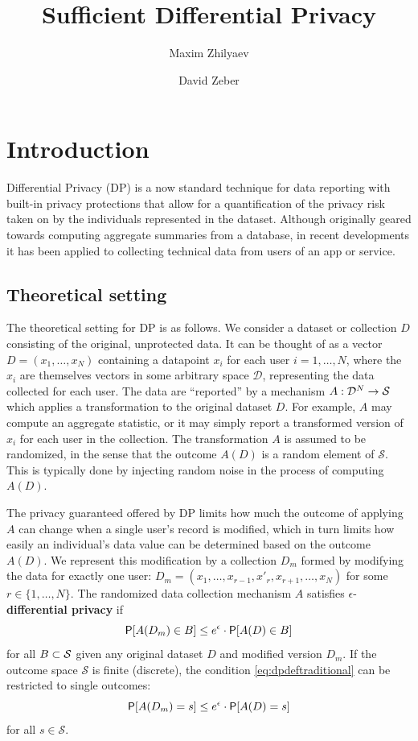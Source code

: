 \documentclass[11pt]{article}
\title{Sufficient Differential Privacy}
\author{Maxim Zhilyaev \and David Zeber}
\newcommand{\Dsp}{\mathcal{D}}
\newcommand{\Ssp}{\mathcal{S}}
\begin{document}
\maketitle


\section{Introduction}

Differential Privacy (DP) is a now standard technique for data reporting with built-in privacy protections that allow for a quantification of the privacy risk taken on by the individuals represented in the dataset.
Although originally geared towards computing aggregate summaries from a database, in recent developments it has been applied to collecting technical data from users of an app or service.

\subsection{Theoretical setting}

The theoretical setting for DP is as follows.
We consider a dataset or collection $D$ consisting of the original, unprotected data. It can be thought of as a vector $D = (x_1,\dots, x_N)$ containing a datapoint $x_i$ for each user $i = 1,\dots,N$, where the $x_i$ are themselves vectors in some arbitrary space $\Dsp$, representing the data collected for each user.
The data are ``reported'' by a mechanism $\map{A}{\Dsp^N}{\Ssp}$ which applies a transformation to the original dataset $D$. For example, $A$ may compute an aggregate statistic, or it may simply report a transformed version of $x_i$ for each user in the collection.
The transformation $A$ is assumed to be randomized, in the sense that the outcome $A(D)$ is a random element of $\Ssp$. This is typically done by injecting random noise in the process of computing $A(D)$.

The privacy guaranteed offered by DP limits how much the outcome of applying $A$ can change when a single user's record is modified, which in turn limits how easily an individual's data value can be determined based on the outcome $A(D)$. 
We represent this modification by a collection $D_m$ formed by modifying the data for exactly one user: $D_m = (x_1,\dots,x_{r-1},x'_r,x_{r+1},\dots,x_N)$ for some $r \in \{1,\dots,N\}$.
The randomized data collection mechanism $A$ satisfies $\epsilon$-\textbf{differential privacy} if
\begin{equation} \label{eq:dpdeftraditional}
\P[A(D_m) \in B] \leq e^\epsilon \cdot\P[A(D) \in B]
\end{equation}
for all $B \cont \Ssp$ given any original dataset $D$ and modified version $D_m$.
If the outcome space $\Ssp$ is finite (discrete), the condition \eqref{eq:dpdeftraditional} can be restricted to single outcomes:
\begin{equation} \label{eq:dpdeftraddiscrete}
\P[A(D_m) = s] \leq e^\epsilon \cdot\P[A(D) = s]
\end{equation}
for all $s\in\Ssp$.
\end{document}
